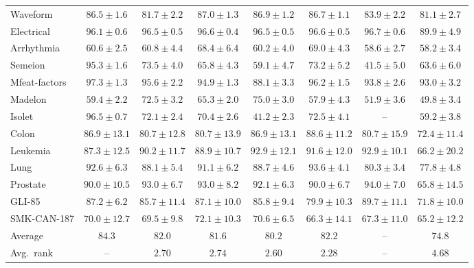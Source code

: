 \begin{minipage}{\linewidth}
{\begin{tabular}{@{}l*{7}{c}@{}}
Waveform & $86.5 \pm 1.6$ & $81.7 \pm 2.2$ & $\mathbf{87.0} \pm 1.3$ & $86.9 \pm 1.2$ & $86.7 \pm 1.1$ & $83.9 \pm 2.2$ & $81.1 \pm 2.7$ \\
Electrical & $96.1 \pm 0.6$ & $96.5 \pm 0.5$ & $96.6 \pm 0.4$ & $96.5 \pm 0.5$ & $96.6 \pm 0.5$ & $\mathbf{96.7} \pm 0.6$ & $89.9 \pm 4.9$ \\
\midrule
Arrhythmia & $60.6 \pm 2.5$ & $60.8 \pm 4.4$ & $68.4 \pm 6.4$ & $60.2 \pm 4.0$ & $\mathbf{69.0} \pm 4.3$ & $58.6 \pm 2.7$ & $58.2 \pm 3.4$ \\
Semeion & $95.3 \pm 1.6$ & $\mathbf{73.5} \pm 4.0$ & $65.8 \pm 4.3$ & $59.1 \pm 4.7$ & $73.2 \pm 5.2$ & $41.5 \pm 5.0$ & $63.6 \pm 6.0$ \\
Mfeat-factors & $97.3 \pm 1.3$ & $95.6 \pm 2.2$ & $94.9 \pm 1.3$ & $88.1 \pm 3.3$ & $\mathbf{96.2} \pm 1.5$ & $93.8 \pm 2.6$ & $93.0 \pm 3.2$ \\
Madelon & $59.4 \pm 2.2$ & $72.5 \pm 3.2$ & $65.3 \pm 2.0$ & $\mathbf{75.0} \pm 3.0$ & $57.9 \pm 4.3$ & $51.9 \pm 3.6$ & $49.8 \pm 3.4$ \\
Isolet & $96.5 \pm 0.7$ & $72.1 \pm 2.4$ & $70.4 \pm 2.6$ & $41.2 \pm 2.3$ & $\mathbf{72.5} \pm 4.1$ & -- & $59.2 \pm 3.8$ \\
\midrule
Colon & $86.9 \pm 13.1$ & $80.7 \pm 12.8$ & $80.7 \pm 13.9$ & $86.9 \pm 13.1$ & $\mathbf{88.6} \pm 11.2$ & $80.7 \pm 15.9$ & $72.4 \pm 11.4$ \\
Leukemia & $87.3 \pm 12.5$ & $90.2 \pm 11.7$ & $88.9 \pm 10.7$ & $\mathbf{92.9} \pm 12.1$ & $91.6 \pm 12.0$ & $\mathbf{92.9} \pm 10.1$ & $66.2 \pm 20.2$ \\
Lung & $92.6 \pm 6.3$ & $88.1 \pm 5.4$ & $91.1 \pm 6.2$ & $88.7 \pm 4.6$ & $\mathbf{93.6} \pm 4.1$ & $80.3 \pm 3.4$ & $77.8 \pm 4.8$ \\
Prostate & $90.0 \pm 10.5$ & $93.0 \pm 6.7$ & $93.0 \pm 8.2$ & $92.1 \pm 6.3$ & $90.0 \pm 6.7$ & $\mathbf{94.0} \pm 7.0$ & $65.8 \pm 14.5$ \\
GLI-85 & $87.2 \pm 6.2$ & $85.7 \pm 11.4$ & $87.1 \pm 10.0$ & $85.8 \pm 9.4$ & $79.9 \pm 10.3$ & $\mathbf{89.7} \pm 11.1$ & $71.8 \pm 10.0$ \\
SMK-CAN-187 & $70.0 \pm 12.7$ & $69.5 \pm 9.8$ & $\mathbf{72.1} \pm 10.3$ & $70.6 \pm 6.5$ & $66.3 \pm 14.1$ & $67.3 \pm 11.0$ & $65.2 \pm 12.2$ \\
\midrule
Average & $84.3$ & $82.0$ & $81.6$ & $80.2$ & $82.2$ & -- & $74.8$ \\
Avg.\ rank & -- & $2.70$ & $2.74$ & $2.60$ & $2.28$ & -- & $4.68$ \\
\bottomrule
\end{tabular}%
}
\end{minipage}\par

